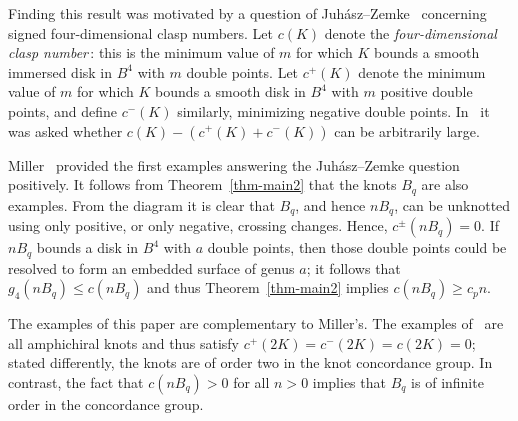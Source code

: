 \documentclass[10pt,oneside]{amsart}
\theoremstyle{definition}
\begin{document}
Finding this result was motivated by a question of Juh\'asz--Zemke~\cite{juhasz2020} concerning signed four-dimensional clasp numbers.   Let   $c(K)$ denote the  {\it four-dimensional clasp number\,}: this is the minimum value  of $m$  for which $K$ bounds  a smooth immersed disk in $B^4$ with $m$ double points. Let   $c^+(K)$ denote the minimum value  of $m$  for which $K$ bounds a smooth disk in $B^4$ with $m$ positive double points, and define  $c^-(K)$ similarly, minimizing negative double points.
In~\cite{juhasz2020} it was asked whether $c(K) - (c^+(K) + c^-(K))$ can be arbitrarily large.

Miller~\cite{MR4453695} provided the first examples answering the Juh\'asz--Zemke question positively.  It follows from Theorem~\ref{thm-main2} that the knots $B_q$ are also examples.  From the diagram it is clear that $B_q$, and hence $nB_q$, can be unknotted using only positive, or only negative, crossing changes.  Hence, $c^\pm(nB_q) = 0$.  If $nB_q$ bounds a disk in $B^4$ with $a$ double points, then those double points could be resolved to form an embedded surface of genus $a$;  it follows that $g_4(nB_q) \le c(nB_q)$ and thus Theorem~\ref{thm-main2} implies $c(nB_q) \ge  c_pn$.

The examples of this paper  are complementary to Miller's. The examples of~\cite{MR4453695}  are all amphichiral knots and thus satisfy $c^+(2K) = c^-(2K) = c(2K) = 0$; stated differently, the knots are of order two in the knot concordance group.  In contrast, the fact that $c(nB_q) >0 $ for all $n >0$ implies that $B_q$ is of infinite order in the concordance group.

\smallskip
\end{document}

